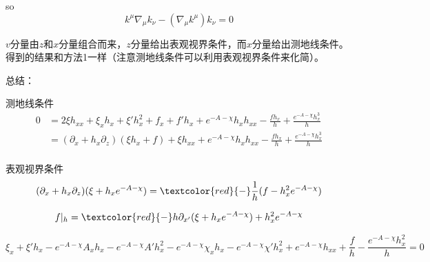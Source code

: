 \documentclass[12pt,a4paper]{ctexart}
\numberwithin{equation}{section}
\begin{document}
so
\begin{equation}
    k^\mu\nabla_\mu k_\nu-(\nabla_\mu k^\mu)k_\nu=0
\end{equation}

$v$分量由$z$和$x$分量组合而来，$z$分量给出表观视界条件，而$x$分量给出测地线条件。得到的结果和方法1一样（注意测地线条件可以利用表观视界条件来化简）。

总结：

测地线条件
\begin{equation}
    \begin{aligned}
        0&=2 \xi h_{xx} + \xi_x h_x + \xi' h_x^2 + f_x + f' h_x + e^{-A-\chi} h_x h_{xx} - \frac{f h_x}{h} + \frac{e^{-A-\chi} h_x^3}{h}\\
        &=(\partial_x+h_x\partial_z)(\xi h_x+f) + \xi h_{xx} + e^{-A-\chi} h_x h_{xx} - \frac{f h_x}{h} + \frac{e^{-A-\chi} h_x^3}{h}\\
    \end{aligned}
\end{equation}

表观视界条件
\begin{equation}
    (\partial_{x}+h_{x}\partial_{z})(\xi+h_{x}e^{-A-\chi})=\textcolor{red}{-}\frac{1}{h}(f-h_{x}^{2}e^{-A-\chi})
\end{equation}

\begin{equation}
    f|_{h}=\textcolor{red}{-}h\partial_{x'}(\xi+h_{x}e^{-A-\chi})+h_{x}^{2}e^{-A-\chi}
\end{equation}

\begin{equation}
    \xi_x + \xi' h_x - e^{-A-\chi} A_x h_x - e^{-A-\chi} A' h_x^2 - e^{-A-\chi} \chi_x h_x - e^{-A-\chi} \chi' h_x^2 + e^{-A-\chi} h_{xx} + \frac{f}{h} - \frac{e^{-A-\chi} h_x^2}{h}=0
\end{equation}
\end{document}
